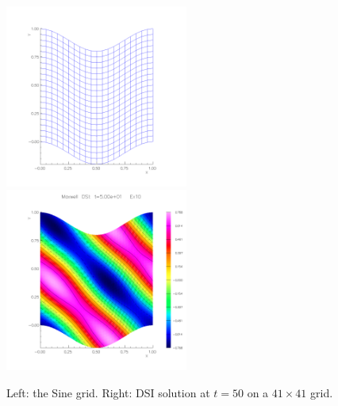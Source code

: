 \documentclass[10pt]{article}
\newcommand{\maxDoc}{\homeHenshaw/res/maxwell/doc}
\begin{document}
{
\newcommand{\figWidtha}{6cm}
\begin{figure}
\begin{center}
\includegraphics[width=\figWidtha]{figures/sineGrid}
\includegraphics[width=\figWidtha]{figures/dsiSine41-t50}
\end{center}
\caption{Left: the Sine grid. Right: DSI solution at $t=50$ on a $41\times 41$ grid.}
\end{figure}
}
\end{document}
